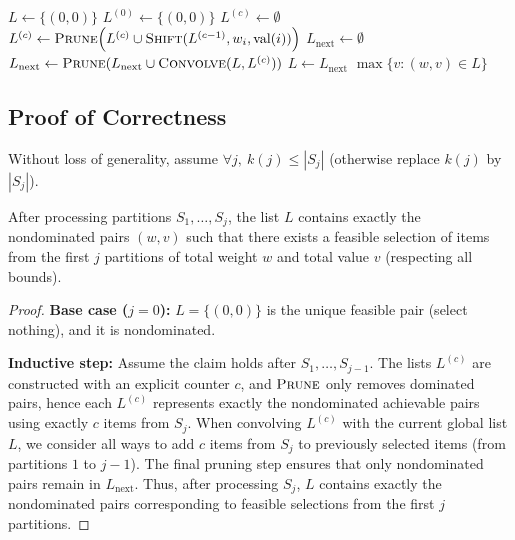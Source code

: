 \begin{algorithm}[H]
\caption{Knapsack with Partition Constraints (Domination Lists)}
\begin{algorithmic}[1]
    \State $L \gets \{(0,0)\}$ 
        \State {}
        \State $L^{(0)} \gets \{(0,0)\}$
         $L^{(c)} \gets \emptyset$ \EndFor
                \State $L^{(c)} \gets \textsc{Prune}\Big( L^{(c)} \cup \textsc{Shift}(L^{(c-1)}, w_i, \text{val}(i))\Big)$
            \EndFor
        \EndFor
        \State {}
        \State $L_{\text{next}} \gets \emptyset$
            \State $L_{\text{next}} \gets \textsc{Prune}(L_{\text{next}} \cup \textsc{Convolve}(L, L^{(c)}))$
        \EndFor
        \State $L \gets L_{\text{next}}$
    \EndFor
    \State \Return $\max\{v : (w,v)\in L\}$
\EndFunction
\end{algorithmic}
\end{algorithm}


\subsection*{Proof of Correctness}
Without loss of generality, assume $\forall j,\ k(j) \le |S_j|$ (otherwise replace $k(j)$ by $|S_j|$).

\begin{lemma}
    After processing partitions $S_1,\dots,S_j$, the list $L$ contains exactly the nondominated pairs $(w,v)$ such that there exists a feasible selection of items from the first $j$ partitions of total weight $w$ and total value $v$ (respecting all bounds).
\end{lemma}

\begin{proof}
    \textbf{Base case ($j=0$):} $L=\{(0,0)\}$ is the unique feasible pair (select nothing), and it is nondominated.

    \textbf{Inductive step:} Assume the claim holds after $S_1,\dots,S_{j-1}$. The lists $L^{(c)}$ are constructed with an explicit counter $c$, and $\textsc{Prune}$ only removes dominated pairs, hence each $L^{(c)}$ represents exactly the nondominated achievable pairs using exactly $c$ items from $S_j$. 
    When convolving $L^{(c)}$ with the current global list $L$, we consider all ways to add $c$ items from $S_j$ to previously selected items (from partitions $1$ to $j-1$). The final pruning step ensures that only nondominated pairs remain in $L_{\text{next}}$. Thus, after processing $S_j$, $L$ contains exactly the nondominated pairs corresponding to feasible selections from the first $j$ partitions.
\end{proof}

